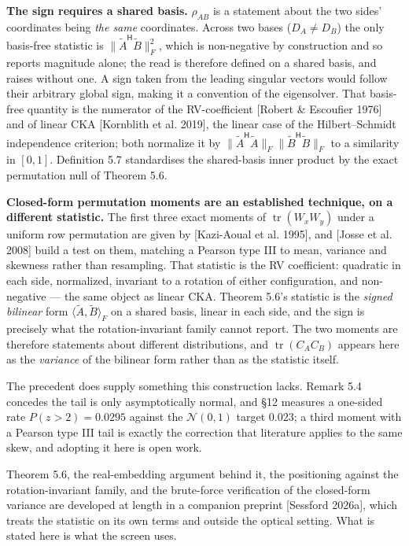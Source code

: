 \documentclass[10pt,letterpaper,twocolumn]{article}
\begin{document}
\textbf{The sign requires a shared basis.} \(\rho_{AB}\) is a statement about the two sides' coordinates being \emph{the same} coordinates. Across two bases (\(D_A\ne D_B\)) the only basis-free statistic is \(\|\tilde A^{\mathsf H}\tilde B\|_F^2\), which is non-negative by construction and so reports magnitude alone; the read is therefore defined on a shared basis, and raises without one. A sign taken from the leading singular vectors would follow their arbitrary global sign, making it a convention of the eigensolver. That basis-free quantity is the numerator of the RV-coefficient {[}Robert \& Escoufier 1976{]} and of linear CKA {[}Kornblith et al. 2019{]}, the linear case of the Hilbert--Schmidt independence criterion; both normalize it by \(\|\tilde A^{\mathsf H}\tilde A\|_F\|\tilde B^{\mathsf H}\tilde B\|_F\) to a similarity in \([0,1]\). Definition 5.7 standardises the shared-basis inner product by the exact permutation null of Theorem 5.6.

\textbf{Closed-form permutation moments are an established technique, on a different statistic.} The first three exact moments of \(\operatorname{tr}(W_xW_y)\) under a uniform row permutation are given by {[}Kazi-Aoual et al. 1995{]}, and {[}Josse et al. 2008{]} build a test on them, matching a Pearson type III to mean, variance and skewness rather than resampling. That statistic is the RV coefficient: quadratic in each side, normalized, invariant to a rotation of either configuration, and non-negative --- the same object as linear CKA. Theorem 5.6's statistic is the \emph{signed bilinear} form \(\langle\tilde A,\tilde B\rangle_F\) on a shared basis, linear in each side, and the sign is precisely what the rotation-invariant family cannot report. The two moments are therefore statements about different distributions, and \(\operatorname{tr}(C_AC_B)\) appears here as the \emph{variance} of the bilinear form rather than as the statistic itself.

The precedent does supply something this construction lacks. Remark 5.4 concedes the tail is only asymptotically normal, and §12 measures a one-sided rate \(P(z>2)=0.0295\) against the \(\mathcal N(0,1)\) target \(0.023\); a third moment with a Pearson type III tail is exactly the correction that literature applies to the same skew, and adopting it here is open work.

Theorem 5.6, the real-embedding argument behind it, the positioning against the rotation-invariant family, and the brute-force verification of the closed-form variance are developed at length in a companion preprint {[}Sessford 2026a{]}, which treats the statistic on its own terms and outside the optical setting. What is stated here is what the screen uses.
\end{document}
